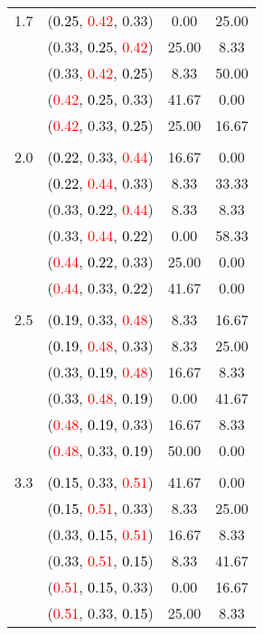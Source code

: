 \documentclass[10pt,a4paper]{report}
\begin{document}
\begin{center}
\begin{longtable}{clcc}
		1.7			&(\textcolor{black}{0.25}, \textcolor{red}{0.42}, 0.33)&0.00&25.00\\
			&(0.33, \textcolor{black}{0.25}, \textcolor{red}{0.42})&25.00&8.33\\
			&(0.33, \textcolor{red}{0.42}, \textcolor{black}{0.25})&8.33&50.00\\
			&(\textcolor{red}{0.42}, \textcolor{black}{0.25}, 0.33)&41.67&0.00\\
			&(\textcolor{red}{0.42}, 0.33, \textcolor{black}{0.25})&25.00&16.67\\
		&&&\\
		2.0			&(\textcolor{black}{0.22}, 0.33, \textcolor{red}{0.44})&16.67&0.00\\
			&(\textcolor{black}{0.22}, \textcolor{red}{0.44}, 0.33)&8.33&33.33\\
			&(0.33, \textcolor{black}{0.22}, \textcolor{red}{0.44})&8.33&8.33\\
			&(0.33, \textcolor{red}{0.44}, \textcolor{black}{0.22})&0.00&58.33\\
			&(\textcolor{red}{0.44}, \textcolor{black}{0.22}, 0.33)&25.00&0.00\\
			&(\textcolor{red}{0.44}, 0.33, \textcolor{black}{0.22})&41.67&0.00\\
		&&&\\
		2.5			&(\textcolor{black}{0.19}, 0.33, \textcolor{red}{0.48})&8.33&16.67\\
			&(\textcolor{black}{0.19}, \textcolor{red}{0.48}, 0.33)&8.33&25.00\\
			&(0.33, \textcolor{black}{0.19}, \textcolor{red}{0.48})&16.67&8.33\\
			&(0.33, \textcolor{red}{0.48}, \textcolor{black}{0.19})&0.00&41.67\\
			&(\textcolor{red}{0.48}, \textcolor{black}{0.19}, 0.33)&16.67&8.33\\
			&(\textcolor{red}{0.48}, 0.33, \textcolor{black}{0.19})&50.00&0.00\\
		&&&\\
		3.3			&(\textcolor{black}{0.15}, 0.33, \textcolor{red}{0.51})&41.67&0.00\\
			&(\textcolor{black}{0.15}, \textcolor{red}{0.51}, 0.33)&8.33&25.00\\
			&(0.33, \textcolor{black}{0.15}, \textcolor{red}{0.51})&16.67&8.33\\
			&(0.33, \textcolor{red}{0.51}, \textcolor{black}{0.15})&8.33&41.67\\
			&(\textcolor{red}{0.51}, \textcolor{black}{0.15}, 0.33)&0.00&16.67\\
			&(\textcolor{red}{0.51}, 0.33, \textcolor{black}{0.15})&25.00&8.33\\
		\bottomrule
	\end{longtable}
\end{center}
\end{document}
